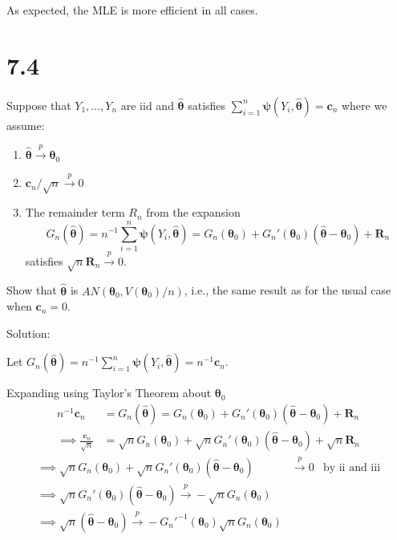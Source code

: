 \documentclass[
  letterpaper,
  DIV=11,
  numbers=noendperiod]{scrreprt}
\begin{document}
As expected, the MLE is more efficient in all cases.

\newpage

\hypertarget{section-45}{%
\section{7.4}\label{section-45}}

Suppose that \(Y_1, \dots, Y_n\) are iid and
\(\boldsymbol{\hat \theta}\) satisfies
\(\sum_{i=1}^n \boldsymbol \psi (Y_i, \boldsymbol{\hat \theta}) = \mathbf c_n\)
where we assume:

\begin{enumerate}
\def\labelenumi{\roman{enumi})}
\item
  \(\boldsymbol{\hat \theta} \overset p \to \boldsymbol \theta_0\)
\item
  \(\mathbf c_n / \sqrt n \overset p \to 0\)
\item
  The remainder term \(R_n\) from the expansion
  \[G_n (\boldsymbol{\hat \theta}) = n^{-1} \sum_{i=1}^n \boldsymbol \psi (Y_i, \boldsymbol{\hat \theta}) = G_n(\boldsymbol \theta_0) +G_n'(\boldsymbol \theta_0)(\boldsymbol{\hat \theta} -\boldsymbol \theta_0) + \mathbf R_n\]
  satisfies \(\sqrt n \mathbf R_n \overset p \to 0\).
\end{enumerate}

Show that \(\boldsymbol{\hat \theta}\) is
\(AN(\boldsymbol \theta_0, V(\boldsymbol \theta_0)/n)\), i.e., the same
result as for the usual case when \(\mathbf c_n = 0\).

Solution:

Let
\(G_n (\boldsymbol{\hat \theta}) = n^{-1} \sum_{i=1}^n \boldsymbol \psi (Y_i, \boldsymbol{\hat \theta}) = n^{-1} \mathbf c_n\).

Expanding using Taylor's Theorem about \(\boldsymbol \theta_0\)
\[\begin{aligned}
 n^{-1} \mathbf c_n &= G_n (\boldsymbol{\hat \theta}) =G_n(\boldsymbol \theta_0) +G_n'(\boldsymbol \theta_0)(\boldsymbol{\hat \theta} -\boldsymbol \theta_0) + \mathbf R_n \\
 \implies \frac {\mathbf c_n} {\sqrt{n}} &= \sqrt n G_n(\boldsymbol \theta_0) + \sqrt n G_n'(\boldsymbol \theta_0)(\boldsymbol{\hat \theta} -\boldsymbol \theta_0) + \sqrt n \mathbf R_n
 \end{aligned}\] \[\begin{aligned}
\implies  \sqrt n G_n(\boldsymbol \theta_0) + \sqrt n G_n'(\boldsymbol \theta_0)(\boldsymbol{\hat \theta} -\boldsymbol \theta_0) &\overset p \to 0 & \text{by ii and iii}\\
\implies \sqrt n G_n'(\boldsymbol \theta_0)(\boldsymbol{\hat \theta} -\boldsymbol \theta_0) \overset p \to -\sqrt n G_n(\boldsymbol \theta_0) \\
\implies \sqrt n (\boldsymbol{\hat \theta} -\boldsymbol \theta_0) \overset p \to -G_n'^{-1}(\boldsymbol \theta_0)\sqrt n   G_n(\boldsymbol \theta_0)
\end{aligned}\]
\end{document}
